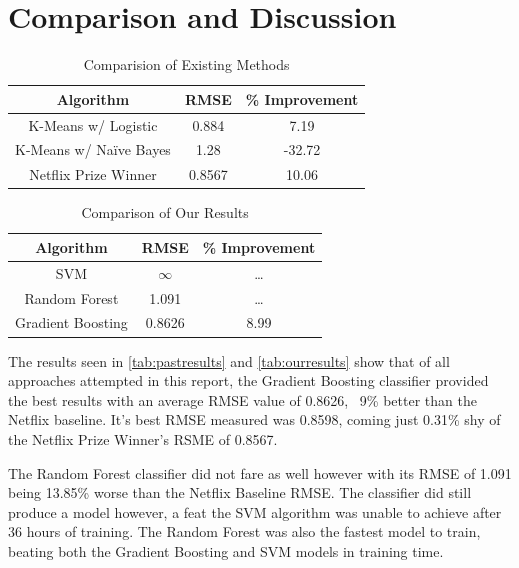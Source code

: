 \documentclass{report}
\begin{document}
	\section{Comparison and Discussion}
	\begin{table}[H]
		\centering
	\begin{tabular}{ccc}
		\hline
		Algorithm & RMSE & \% Improvement\\
		\hline
		K-Means w/ Logistic \autocite{Bystrom} & 0.884 & 7.19	\\
		K-Means w/ Na\"ive Bayes \autocite{CS229} & 1.28 & -32.72\\
		Netflix Prize Winner & 0.8567 & 10.06\\
		\hline
	\end{tabular}
	\caption{Comparision of Existing Methods}
	\label{tab:pastresults}
	\end{table}
	\begin{table}[H]
		\centering
		\begin{tabular}{ccc}
			\hline
			Algorithm & RMSE & \% Improvement\\
			\hline
			SVM & $\infty$ & \dots	\\
			Random Forest & 1.091 & \dots\\
			Gradient Boosting & 0.8626 & 8.99\\
			\hline
		\end{tabular}
	\caption{Comparison of Our Results}
	\label{tab:ourresults}
	\end{table}
	The results seen in \autoref{tab:pastresults} and \autoref{tab:ourresults} show that of all approaches attempted in this report, the Gradient Boosting classifier provided the best results with an average RMSE value of 0.8626, ~9\% better than the Netflix baseline. It’s best RMSE measured was 0.8598, coming just 0.31\% shy of the Netflix Prize Winner’s RSME of 0.8567.
	
	The Random Forest classifier did not fare as well however with its RMSE of 1.091 being 13.85\% worse than the Netflix Baseline RMSE. The classifier did still produce a model however, a feat the SVM algorithm was unable to achieve after 36 hours of training. The Random Forest was also the fastest model to train, beating both the Gradient Boosting and SVM models in training time.
	
	
\end{document}
